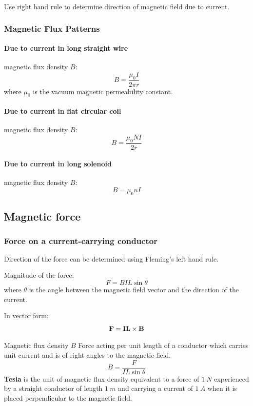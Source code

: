 Use right hand rule to determine direction of magnetic field due to current.

\subsubsection{Magnetic Flux Patterns}
\paragraph{Due to current in long straight wire}
magnetic flux density $B$:
\begin{equation}
B = \frac{\mu_0I}{2\pi r}
\end{equation}
where $\mu_0$ is the vacuum magnetic permeability constant.

\paragraph{Due to current in flat circular coil}
magnetic flux density $B$:
\begin{equation}
B = \frac{\mu_0 NI}{2r}
\end{equation}

\paragraph{Due to current in long solenoid}
magnetic flux density $B$:
\begin{equation}
B = \mu_0 nI
\end{equation}

\subsection{Magnetic force}
\subsubsection{Force on a current-carrying conductor}
Direction of the force can be determined using Fleming’s left hand rule. 

Magnitude of the force:
\begin{equation}
F = BIL\sin\theta
\end{equation}
where $\theta$ is the angle between the magnetic field vector and the direction of the current.

In vector form:
\[ \vb{F} = \vb{IL} \times \vb{B} \]

\begin{defn}{Magnetic flux density $B$}{}
Force acting per unit length of a conductor which carries unit current and is of right angles to the magnetic field.
\[ B = \frac{F}{IL\sin\theta} \]
\textbf{Tesla} is the unit of magnetic flux density equivalent to a force of $1\:\unit{N}$ experienced by a straight conductor of length $1\:\unit{m}$ and carrying a current of $1\:\unit{A}$ when it is placed perpendicular to the magnetic field.
\end{defn}

